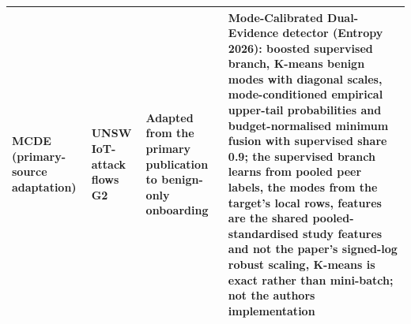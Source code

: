\begin{tabular}{llll}
MCDE (primary-source adaptation) & UNSW IoT-attack flows G2 & Adapted from the primary publication to benign-only onboarding & Mode-Calibrated Dual-Evidence detector (Entropy 2026): boosted supervised branch, K-means benign modes with diagonal scales, mode-conditioned empirical upper-tail probabilities and budget-normalised minimum fusion with supervised share 0.9; the supervised branch learns from pooled peer labels, the modes from the target's local rows, features are the shared pooled-standardised study features and not the paper's signed-log robust scaling, K-means is exact rather than mini-batch; not the authors implementation \\
\bottomrule
\end{tabular}
